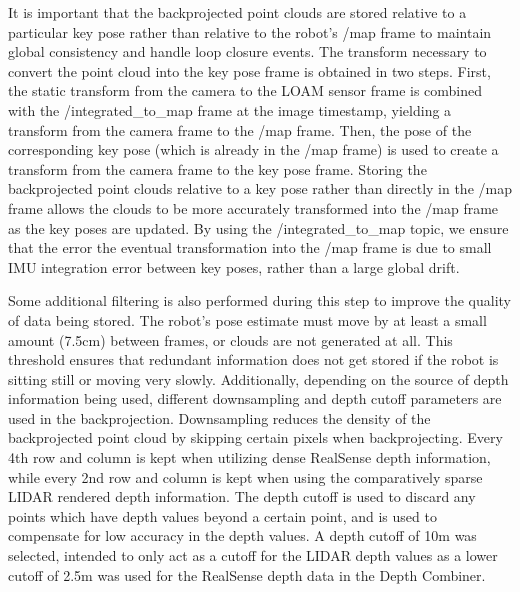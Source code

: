 It is important that the backprojected point clouds are stored relative to a particular key pose rather than relative to the robot's /map frame to maintain global consistency and handle loop closure events. The transform necessary to convert the point cloud into the key pose frame is obtained in two steps. First, the static transform from the camera to the LOAM sensor frame is combined with the /integrated\_to\_map frame at the image timestamp, yielding a transform from the camera frame to the /map frame. Then, the pose of the corresponding key pose (which is already in the /map frame) is used to create a transform from the camera frame to the key pose frame. Storing the backprojected point clouds relative to a key pose rather than directly in the /map frame allows the clouds to be more accurately transformed into the /map frame as the key poses are updated. By using the /integrated\_to\_map topic, we ensure that the error the eventual transformation into the /map frame is due to small IMU integration error between key poses, rather than a large global drift.
	
Some additional filtering is also performed during this step to improve the quality of data being stored. The robot's pose estimate must move by at least a small amount (7.5cm) between frames, or clouds are not generated at all. This threshold ensures that redundant information does not get stored if the robot is sitting still or moving very slowly. Additionally, depending on the source of depth information being used, different downsampling and depth cutoff parameters are used in the backprojection. Downsampling reduces the density of the backprojected point cloud by skipping certain pixels when backprojecting. Every 4th row and column is kept when utilizing dense RealSense depth information, while every 2nd row and column is kept when using the comparatively sparse LIDAR rendered depth information. The depth cutoff is used to discard any points which have depth values beyond a certain point, and is used to compensate for low accuracy in the depth values. A depth cutoff of 10m was selected, intended to only act as a cutoff for the LIDAR depth values as a lower cutoff of 2.5m was used for the RealSense depth data in the Depth Combiner.
	
